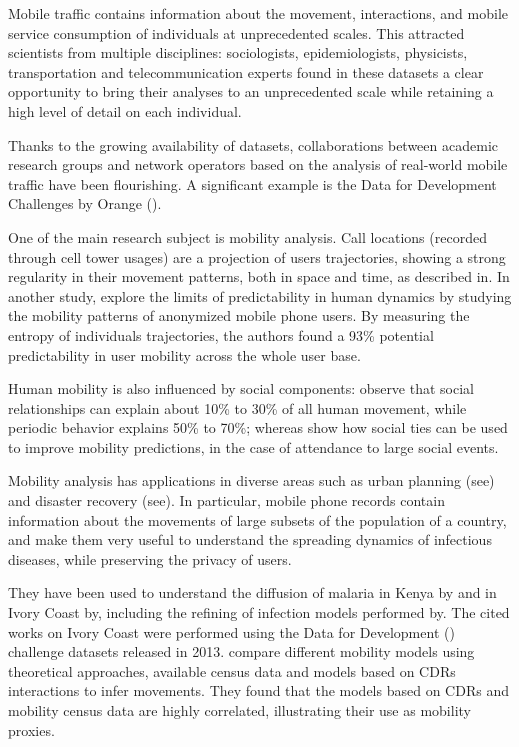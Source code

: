 Mobile traffic contains information about the movement, interactions, and mobile service consumption of individuals at unprecedented scales.
This attracted scientists from multiple disciplines:
sociologists, epidemiologists, physicists, transportation and telecommunication experts
found in these datasets a clear opportunity to bring their analyses to an unprecedented scale while retaining a high level of detail on each individual.

Thanks to the growing availability of datasets, collaborations between academic research groups and network operators based on the analysis of real-world mobile traffic have been flourishing. A significant example is the Data for Development Challenges by Orange (\cite{d4d}).

One of the main research subject is mobility analysis.
Call locations (recorded through cell tower usages) are a projection of users trajectories,
showing a strong regularity in their movement patterns,
both in space and time, as described in\cite{gonzalez2008understanding}.
In another study,\cite{song2010limits} explore the limits of predictability in human dynamics by studying the mobility patterns of anonymized mobile phone users.
By measuring the entropy of individuals trajectories, the authors found a 93\% potential predictability in user mobility across the whole user base.

Human mobility is also influenced by social components:\cite{cho2011friendship} observe that social relationships
can explain about 10\% to 30\% of all human movement, while periodic
behavior explains 50\% to 70\%; whereas\cite{ponieman2016mobility} show how social ties can be used to improve mobility predictions, in the case of attendance to large social events.

Mobility analysis has applications in diverse areas such as urban planning (see\cite{wang2012understanding})  and disaster recovery (see\cite{lu2012predictability}).
In particular, mobile phone records contain information about the movements of large subsets of the population of a country, and make them very useful to understand the spreading dynamics of infectious diseases, while preserving the privacy of users.

They have been used to understand the diffusion of malaria in Kenya by\cite{wesolowski2012quantifying} and in Ivory Coast by\cite{enns2013human}, including the refining of infection models performed by\cite{chunara2013large}. The cited works on Ivory Coast were performed using the Data for Development (\cite{d4d}) challenge datasets released in 2013.\cite{tizzoni2014use} compare different mobility models using theoretical approaches, available census data and models based on CDRs interactions to infer movements. They found that the models based on CDRs and mobility census data are highly correlated, illustrating their use as mobility proxies.

